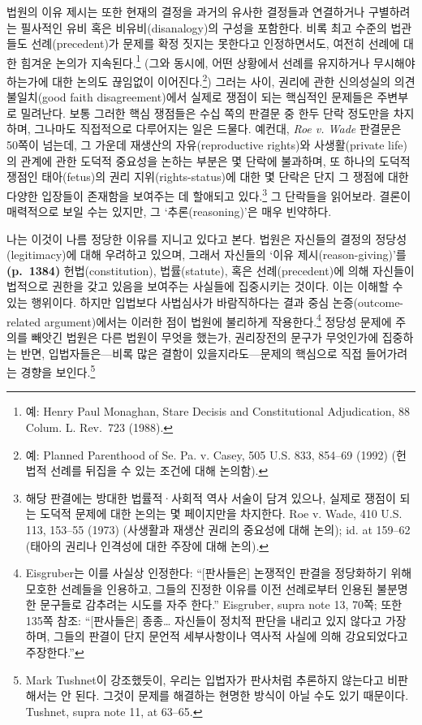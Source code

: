 \documentclass[a4paper,12pt,oneside]{article}  %
\begin{document}
법원의 이유 제시는 또한 현재의 결정을 과거의 유사한 결정들과 연결하거나
구별하려는 필사적인 유비 혹은 비유비(disanalogy)의 구성을 포함한다. 비록
최고 수준의 법관들도 선례(precedent)가 문제를 확정 짓지는 못한다고
인정하면서도, 여전히 선례에 대한 힘겨운 논의가 지속된다.\footnote{예:
  Henry Paul Monaghan, Stare Decisis and Constitutional Adjudication, 88
  Colum. L. Rev.~723 (1988).} (그와 동시에, 어떤 상황에서 선례를
유지하거나 무시해야 하는가에 대한 논의도 끊임없이 이어진다.\footnote{예:
  Planned Parenthood of Se. Pa. v. Casey, 505 U.S. 833, 854--69 (1992)
  (헌법적 선례를 뒤집을 수 있는 조건에 대해 논의함).}) 그러는 사이,
권리에 관한 신의성실의 의견불일치(good faith disagreement)에서 실제로
쟁점이 되는 핵심적인 문제들은 주변부로 밀려난다. 보통 그러한 핵심
쟁점들은 수십 쪽의 판결문 중 한두 단락 정도만을 차지하며, 그나마도
직접적으로 다루어지는 일은 드물다. 예컨대, \emph{Roe v.
Wade} 판결문은 50쪽이 넘는데, 그 가운데 재생산의 자유(reproductive
rights)와 사생활(private life)의 관계에 관한 도덕적 중요성을 논하는
부분은 몇 단락에 불과하며, 또 하나의 도덕적 쟁점인 태아(fetus)의 권리
지위(rights-status)에 대한 몇 단락은 단지 그 쟁점에 대한 다양한 입장들이
존재함을 보여주는 데 할애되고 있다.\footnote{해당 판결에는 방대한
  법률적·사회적 역사 서술이 담겨 있으나, 실제로 쟁점이 되는 도덕적
  문제에 대한 논의는 몇 페이지만을 차지한다. Roe v. Wade, 410 U.S. 113,
  153--55 (1973) (사생활과 재생산 권리의 중요성에 대해 논의); id. at
  159--62 (태아의 권리나 인격성에 대한 주장에 대해 논의).} 그 단락들을
읽어보라. 결론이 매력적으로 보일 수는 있지만, 그 `추론(reasoning)'은
매우 빈약하다.

나는 이것이 나름 정당한 이유를 지니고 있다고 본다. 법원은 자신들의
결정의 정당성(legitimacy)에 대해 우려하고 있으며, 그래서 자신들의 `이유
제시(reason-giving)'를 \textbf{(p.~1384)} 헌법(constitution),
법률(statute), 혹은 선례(precedent)에 의해 자신들이 법적으로 권한을 갖고
있음을 보여주는 사실들에 집중시키는 것이다. 이는 이해할 수 있는
행위이다. 하지만 입법보다 사법심사가 바람직하다는 결과 중심
논증(outcome-related argument)에서는 이러한 점이 법원에 불리하게
작용한다.\footnote{Eisgruber는 이를 사실상 인정한다: ``{[}판사들은{]}
  논쟁적인 판결을 정당화하기 위해 모호한 선례들을 인용하고, 그들의
  진정한 이유를 이전 선례로부터 인용된 불분명한 문구들로 감추려는 시도를
  자주 한다.'' Eisgruber, supra note 13, 70쪽; 또한 135쪽 참조:
  ``{[}판사들은{]} 종종\ldots{} 자신들이 정치적 판단을 내리고 있지
  않다고 가장하며, 그들의 판결이 단지 문언적 세부사항이나 역사적 사실에
  의해 강요되었다고 주장한다.''} 정당성 문제에 주의를 빼앗긴 법원은 다른
법원이 무엇을 했는가, 권리장전의 문구가 무엇인가에 집중하는 반면,
입법자들은---비록 많은 결함이 있을지라도---문제의 핵심으로 직접
들어가려는 경향을 보인다.\footnote{Mark Tushnet이 강조했듯이, 우리는
  입법자가 판사처럼 추론하지 않는다고 비판해서는 안 된다. 그것이 문제를
  해결하는 현명한 방식이 아닐 수도 있기 때문이다. Tushnet, supra note
  11, at 63--65.}
\end{document}
